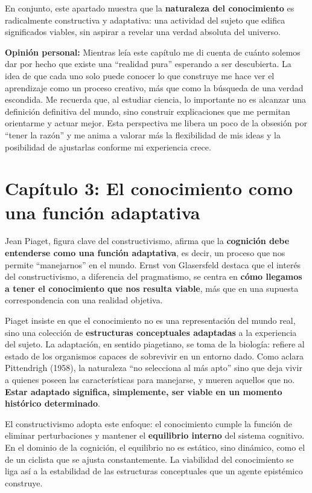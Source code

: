 \documentclass{article}
\begin{document}
En conjunto, este apartado muestra que la \textbf{naturaleza del conocimiento} es radicalmente constructiva y adaptativa: una actividad del sujeto que edifica significados viables, sin aspirar a revelar una verdad absoluta del universo.

\textbf{Opinión personal:}  
Mientras leía este capítulo me di cuenta de cuánto solemos dar por hecho que existe una “realidad pura” esperando a ser descubierta. La idea de que cada uno solo puede conocer lo que construye me hace ver el aprendizaje como un proceso creativo, más que como la búsqueda de una verdad escondida. Me recuerda que, al estudiar ciencia, lo importante no es alcanzar una definición definitiva del mundo, sino construir explicaciones que me permitan orientarme y actuar mejor. Esta perspectiva me libera un poco de la obsesión por “tener la razón” y me anima a valorar más la flexibilidad de mis ideas y la posibilidad de ajustarlas conforme mi experiencia crece.


\section*{Capítulo 3: El conocimiento como una función adaptativa}

Jean Piaget, figura clave del constructivismo, afirma que la \textbf{cognición debe entenderse como una función adaptativa}, es decir, un proceso que nos permite ``manejarnos'' en el mundo. Ernst von Glasersfeld destaca que el interés del constructivismo, a diferencia del pragmatismo, se centra en \textbf{cómo llegamos a tener el conocimiento que nos resulta viable}, más que en una supuesta correspondencia con una realidad objetiva.

Piaget insiste en que el conocimiento no es una representación del mundo real, sino una colección de \textbf{estructuras conceptuales adaptadas} a la experiencia del sujeto. La adaptación, en sentido piagetiano, se toma de la biología: refiere al estado de los organismos capaces de sobrevivir en un entorno dado. Como aclara Pittendrigh (1958), la naturaleza ``no selecciona al más apto'' sino que deja vivir a quienes poseen las características para manejarse, y mueren aquellos que no. \textbf{Estar adaptado significa, simplemente, ser viable en un momento histórico determinado}.

El constructivismo adopta este enfoque: el conocimiento cumple la función de eliminar perturbaciones y mantener el \textbf{equilibrio interno} del sistema cognitivo. En el dominio de la cognición, el equilibrio no es estático, sino dinámico, como el de un ciclista que se ajusta constantemente. La viabilidad del conocimiento se liga así a la estabilidad de las estructuras conceptuales que un agente epistémico construye.
\end{document}
